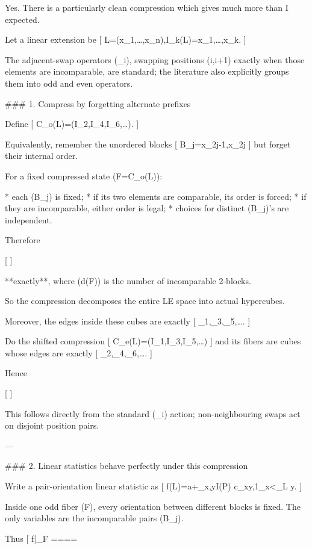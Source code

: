 Yes. There is a particularly clean compression which gives much more than I expected.

Let a linear extension be
[
L=(x_1,\ldots,x_n),\qquad I_k(L)={x_1,\ldots,x_k}.
]

The adjacent-swap operators (\tau_i), swapping positions (i,i+1) exactly when those elements are incomparable, are standard; the literature also explicitly groups them into odd and even operators. 

### 1. Compress by forgetting alternate prefixes

Define
[
C_o(L)=(I_2,I_4,I_6,\ldots).
]

Equivalently, remember the unordered blocks
[
B_j={x_{2j-1},x_{2j}}
]
but forget their internal order.

For a fixed compressed state (F=C_o(L)):

* each (B_j) is fixed;
* if its two elements are comparable, its order is forced;
* if they are incomparable, either order is legal;
* choices for distinct (B_j)'s are independent.

Therefore

[
]

**exactly**, where (d(F)) is the number of incomparable 2-blocks.

So the compression decomposes the entire LE space into actual hypercubes.

Moreover, the edges inside these cubes are exactly
[
\tau_1,\tau_3,\tau_5,\ldots.
]

Do the shifted compression
[
C_e(L)=(I_1,I_3,I_5,\ldots)
]
and its fibers are cubes whose edges are exactly
[
\tau_2,\tau_4,\tau_6,\ldots.
]

Hence

[
]

This follows directly from the standard (\tau_i) action; non-neighbouring swaps act on disjoint position pairs. 

---

### 2. Linear statistics behave perfectly under this compression

Write a pair-orientation linear statistic as
[
f(L)=a+\sum_{{x,y}\in I(P)}
c_{xy},1_{{x<_L y}}.
]

Inside one odd fiber (F), every orientation between different blocks is fixed. The only variables are the incomparable pairs (B_j).

Thus
[
f|_F
====

